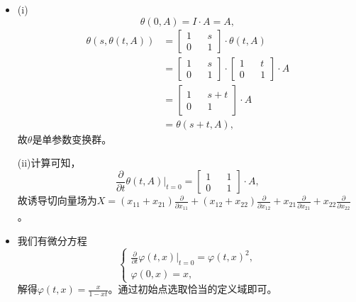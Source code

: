 \begin {itemize}
    \item[17.]
    (i)
	\begin{equation*}
		\theta(0,A)=I\cdot A=A,
	\end{equation*}
	\begin{align*}
		\theta(s,\theta(t,A))&=\begin{bmatrix}
			1&&s\\
			0&&1
		\end{bmatrix}\cdot\theta(t,A)\\
		&=\begin{bmatrix}
			1&&s\\
			0&&1
		\end{bmatrix}\cdot
		\begin{bmatrix}
			1&&t\\
			0&&1
		\end{bmatrix}\cdot A\\
		&=\begin{bmatrix}
			1&&s+t\\
			0&&1
		\end{bmatrix}\cdot A\\
		&=\theta(s+t,A),
	\end{align*}
	故$\theta$是单参数变换群。\par
	(ii)计算可知，
	\begin{equation*}
		\frac{\partial}{\partial t}\theta(t,A)|_{t=0}=\begin{bmatrix}
			1&&1\\
			0&&1
		\end{bmatrix}\cdot A,
	\end{equation*}
	故诱导切向量场为$X=(x_{11}+x_{21})\frac{\partial}{\partial x_{11}}+(x_{12}+x_{22})\frac{\partial}{\partial x_{12}}+x_{21}\frac{\partial}{\partial x_{21}}+x_{22}\frac{\partial}{\partial x_{22}}$。

    \item[18.]
    我们有微分方程
	\begin{equation*}
		\begin{cases}
			\frac{\partial}{\partial t}\varphi(t,x)|_{t=0}=\varphi(t,x)^2,\\
			\varphi(0,x)=x,
		\end{cases}
	\end{equation*}
	解得$\varphi(t,x)=\frac{x}{1-xt}$。通过初始点选取恰当的定义域即可。


\end{itemize}
